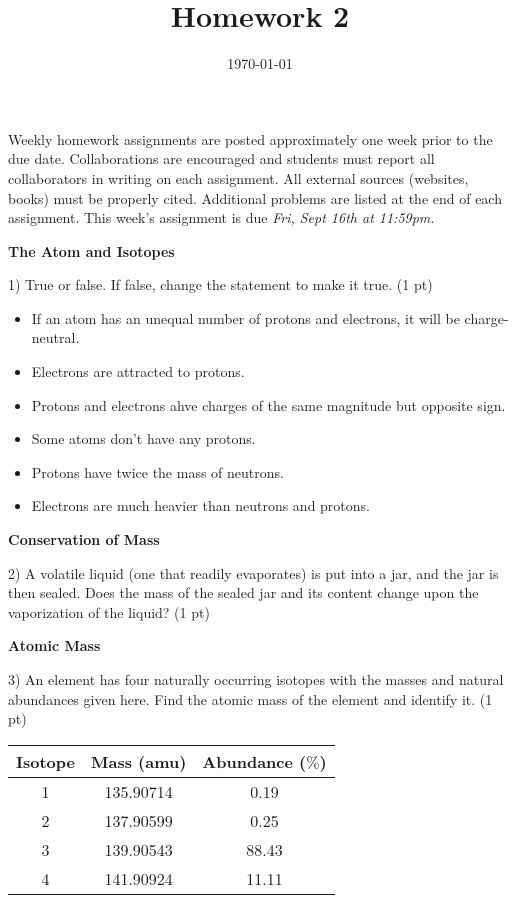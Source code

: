 \documentclass[12pt]{article}
\title{\textbf{Homework 2}}
\date{\vspace{-2em}\today}
\begin{document}
\maketitle 

Weekly homework assignments are posted approximately one week prior to the
due date. Collaborations are encouraged and students must report all collaborators
in writing on each assignment. All external sources (websites, books) must be
properly cited. Additional problems are listed at the end of each assignment.
This week's assignment is due \textit{Fri, Sept 16th at 11:59pm.}

\textbf{The Atom and Isotopes}

1) True or false. If false, change the statement to make it true. (1 pt)

\begin{itemize}
\item If an atom has an unequal number of protons and electrons, it will be
  charge-neutral.
\item Electrons are attracted to protons.
\item Protons and electrons ahve charges of the same magnitude but opposite
  sign.
\item Some atoms don't have any protons.
\item Protons have twice the mass of neutrons.
\item Electrons are much heavier than neutrons and protons.
\end{itemize}

\vspace{1in}

\textbf{Conservation of Mass}

2) A volatile liquid (one that readily evaporates) is put into a jar, and the
jar is then sealed. Does the mass of the sealed jar and its content change
upon the vaporization of the liquid? (1 pt)

\pagebreak

\textbf{Atomic Mass}

3) An element has four naturally occurring isotopes with the masses and natural
abundances given here. Find the atomic mass of the element and identify it. (1 pt)
\begin{table}[hbpt]
  \begin{tabular}{ccc}
    Isotope & Mass (amu) & Abundance ($\%$) \\
    \hline
    1 & 135.90714 & 0.19 \\
    2 & 137.90599 & 0.25 \\
    3 & 139.90543 & 88.43\\
    4 & 141.90924 & 11.11
  \end{tabular}
\end{table}
\end{document}
